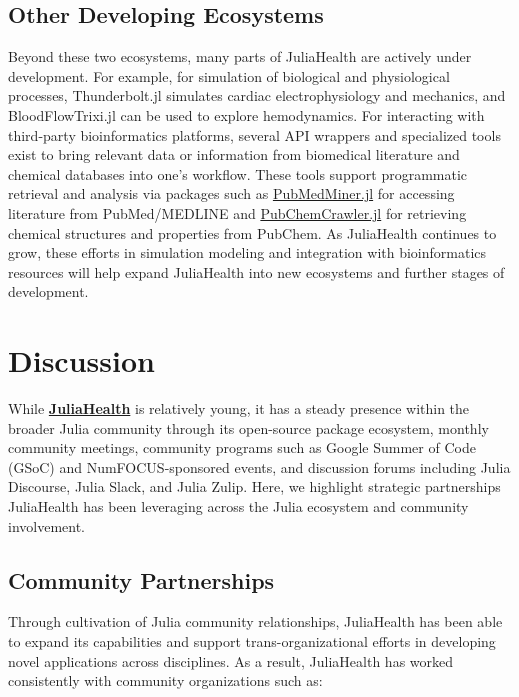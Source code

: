 \documentclass{juliacon}
\begin{document}
\subsection{Other Developing Ecosystems}

Beyond these two ecosystems, many parts of JuliaHealth are actively under development.
For example, for simulation of biological and physiological processes, Thunderbolt.jl simulates cardiac electrophysiology and mechanics, and BloodFlowTrixi.jl can be used to explore hemodynamics. \cite{mannes2024derivation, mannes2024derivationPhD, ersoy2024new}
For interacting with third-party bioinformatics platforms, several API wrappers and specialized tools exist to bring relevant data or information from biomedical literature and chemical databases into one's workflow.
These tools support programmatic retrieval and analysis via packages such as \href{https://github.com/JuliaHealth/PubMedMiner.jl}{PubMedMiner.jl} for accessing literature from PubMed/MEDLINE and \href{https://github.com/JuliaHealth/PubChemCrawler.jl}{PubChemCrawler.jl} for retrieving chemical structures and properties from PubChem.
As JuliaHealth continues to grow, these efforts in simulation modeling and integration with bioinformatics resources will help expand JuliaHealth into new ecosystems and further stages of development. \cite{datseris2024physiological}

\section{Discussion}

While \href{https://github.com/JuliaHealth}{\textbf{JuliaHealth}} is relatively young, it has a steady presence within the broader Julia community through its open-source package ecosystem, monthly community meetings, community programs such as Google Summer of Code (GSoC) and NumFOCUS-sponsored events, and discussion forums including Julia Discourse, Julia Slack, and Julia Zulip.
Here, we highlight strategic partnerships JuliaHealth has been leveraging across the Julia ecosystem and community involvement.

\subsection{Community Partnerships}

Through cultivation of Julia community relationships, JuliaHealth has been able to expand its capabilities and support trans-organizational efforts in developing novel applications across disciplines. 
As a result, JuliaHealth has worked consistently with community organizations such as: 
\end{document}
